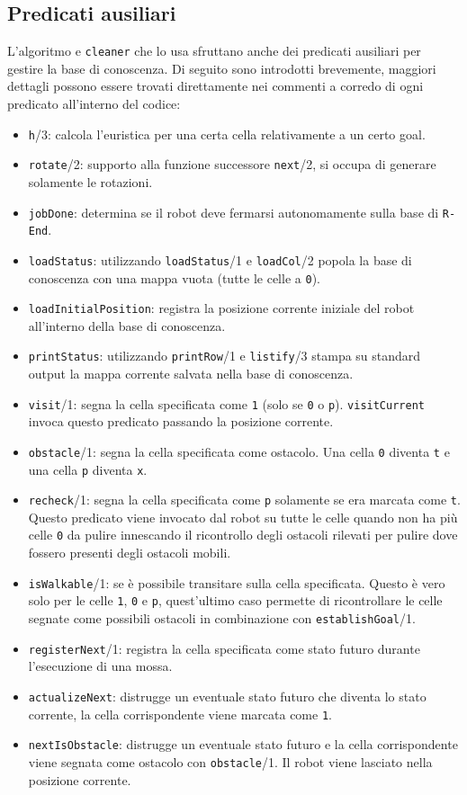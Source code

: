 \subsection{Predicati ausiliari}
L'algoritmo e \texttt{cleaner} che lo usa sfruttano anche dei predicati ausiliari per gestire la base di conoscenza. Di seguito sono introdotti brevemente, maggiori dettagli possono essere trovati direttamente nei commenti a corredo di ogni predicato all'interno del codice:
\begin{itemize}
	\item \texttt{h}/3: calcola l'euristica per una certa cella relativamente a un certo goal.
	\item \texttt{rotate}/2: supporto alla funzione successore \texttt{next}/2, si occupa di generare solamente le rotazioni.
	\item \texttt{jobDone}: determina se il robot deve fermarsi autonomamente sulla base di \texttt{R-End}.
	\item \texttt{loadStatus}: utilizzando \texttt{loadStatus}/1 e \texttt{loadCol}/2 popola la base di conoscenza con una mappa vuota (tutte le celle a \texttt{0}).
	\item \texttt{loadInitialPosition}: registra la posizione corrente iniziale del robot all'interno della base di conoscenza.
	\item \texttt{printStatus}: utilizzando \texttt{printRow}/1 e \texttt{listify}/3 stampa su standard output la mappa corrente salvata nella base di conoscenza.
	\item \texttt{visit}/1: segna la cella specificata come \texttt{1} (solo se \texttt{0} o \texttt{p}). \texttt{visitCurrent} invoca questo predicato passando la posizione corrente.
	\item \texttt{obstacle}/1: segna la cella specificata come ostacolo. Una cella \texttt{0} diventa \texttt{t} e una cella \texttt{p} diventa \texttt{x}.
	\item \texttt{recheck}/1: segna la cella specificata come \texttt{p} solamente se era marcata come \texttt{t}. Questo predicato viene invocato dal robot su tutte le celle quando non ha più celle \texttt{0} da pulire innescando il ricontrollo degli ostacoli rilevati per pulire dove fossero presenti degli ostacoli mobili.
	\item \texttt{isWalkable}/1: se è possibile transitare sulla cella specificata. Questo è vero solo per le celle \texttt{1}, \texttt{0} e \texttt{p}, quest'ultimo caso permette di ricontrollare le celle segnate come possibili ostacoli in combinazione con \texttt{establishGoal}/1.
	\item \texttt{registerNext}/1: registra la cella specificata come stato futuro durante l'esecuzione di una mossa.
	\item \texttt{actualizeNext}: distrugge un eventuale stato futuro che diventa lo stato corrente, la cella corrispondente viene marcata come \texttt{1}.
	\item \texttt{nextIsObstacle}: distrugge un eventuale stato futuro e la cella corrispondente viene segnata come ostacolo con \texttt{obstacle}/1. Il robot viene lasciato nella posizione corrente.
\end{itemize}

